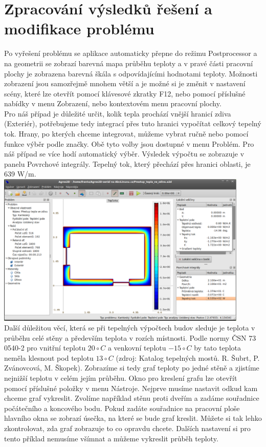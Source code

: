 \documentclass[a4paper, oneside]{article}
\begin{document}
\section{Zpracování výsledků řešení a modifikace problému}
Po vyřešení problému se aplikace automaticky přepne do režimu Postprocessor a na geometrii se zobrazí barevná mapa průběhu teploty a v pravé části pracovní plochy je zobrazena barevná škála s odpovídajícími hodnotami teploty. Možnosti zobrazení jsou samozřejmě mnohem větší a je možné si je změnit v nastavení scény, které lze otevřít pomocí klávesové zkratky F12, nebo pomocí příslušné nabídky v menu Zobrazení, nebo kontextovém menu pracovní plochy.\\
Pro náš případ je důležité určit, kolik tepla prochází vnější hranicí zdiva (Exteriér), potřebujeme tedy integrací přes tuto hranici vypočítat celkový tepelný tok. Hrany, po kterých chceme integrovat, můžeme vybrat ručně nebo pomocí funkce výběr podle značky. Obě tyto volby jsou dostupné v menu Problém. Pro náš případ se více hodí automatický výběr. Výsledek výpočtu se zobrazuje v panelu Povrchové integrály. Tepelný tok, který přechází přes hranici oblasti, je 639 W/m.\\
\includegraphics[width=12cm]{Vypocet_tepelneho_toku.eps}\\
Další důležitou věcí, která se při tepelných výpočtech budov sleduje je teplota v průběhu celé stěny a především teplota v rozích místnosti. Podle normy ČSN 73 0540-2 pro vnitřní teplotu $20 \circ C$ a venkovní teplotu $-15 \circ C$ by tato teplota neměla klesnout pod teplotu $13 \circ C$ (zdroj: Katalog tepelných mostů. R. Šubrt, P. Zvánovcová, M. Škopek). Zobrazíme si tedy graf teploty po jedné stěně a zjistíme nejnižší teplotu v celém jejím průběhu. Okno pro kreslení grafu lze otevřít pomocí příslušné položky v menu Nástroje. Nejprve musíme nastavit odkud kam chceme graf vykreslit. Zvolíme například stěnu proti dveřím a zadáme souřadnice počátečního a koncového bodu. Pokud zadáte souřadnice na pracovní ploše hlavního okna se zobrazí úsečka, na které se bude graf kreslit. Můžete si tak lehko zkontrolovat, zda graf zobrazuje to co opravdu chcete. Dalších nastavení si pro tento příklad nemusíme všímnat a můžeme vykreslit průběh teploty.\\
\end{document}
